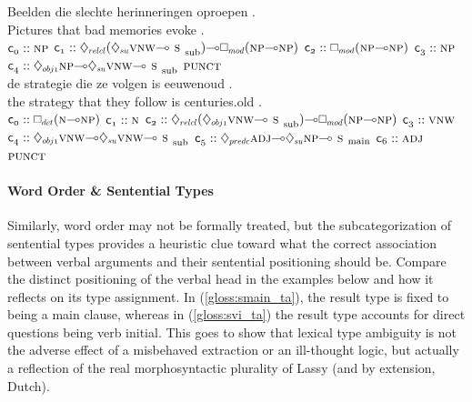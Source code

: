\begin{exe}
\label{gloss:su}
\glll Beelden die slechte herinneringen oproepen .\\
Pictures that bad memories evoke . \\
	$\con{0}::\np[s]$
	$\con{1}::\ddia{relcl}(\ddia{su}\vnw[s]\li\ssub)\li\dbox{mod}(\np[s]\li\np[s])$
	$\con{2}::\dbox{mod}(\np[s]\li\np[s])$
	$\con{3}::\np[s]$
	$\con{4}::\ddia{obj1}\np[s]\li\ddia{su}\vnw[s]\li\ssub$
	$\punct[s]$\\
\label{gloss:obj}
\glll de strategie die ze volgen is eeuwenoud .\\
the strategy that they follow is centuries.old .\\
	$\con{0}::\dbox{det}(\n[s]\li\np[s])$ 
	$\con{1}::\n[s]$
	$\con{2}::\ddia{relcl}(\ddia{obj1}\vnw[s]\li\ssub)\li\dbox{mod}(\np[s]\li\np[s])$
	$\con{3}::\vnw[s]$
	$\con{4}::\ddia{obj1}\vnw[s]\li\ddia{su}\vnw[s]\li\ssub$
	$\con{5}::\ddia{predc}\adj[s]\li\ddia{su}\np[s]\li\smain[s]$
	$\con{6}::\adj[s]$
	$\punct[s]$\\
\end{exe}

\paragraph{Word Order \& Sentential Types}
Similarly, word order may not be formally treated, but the subcategorization of sentential types provides a heuristic clue toward what the correct association between verbal arguments and their sentential positioning should be.
Compare the distinct positioning of the verbal head  in the examples below and how it reflects on its type assignment.
In (\ref{gloss:smain_ta}), the result type is fixed to being a main clause, whereas in (\ref{gloss:svi_ta}) the result type accounts for direct questions being verb initial.
This goes to show that lexical type ambiguity is not the adverse effect of a misbehaved extraction or an ill-thought logic, but actually a reflection of the real morphosyntactic plurality of Lassy (and by extension, Dutch).

